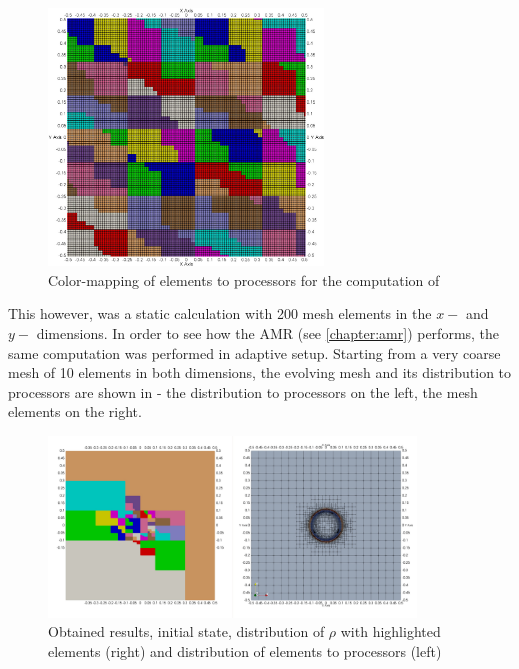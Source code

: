 \begin{figure}[H]
	\begin{center}
		\includegraphics[width=0.65\textwidth]{img/mhd-blast/old/subdomain.jpg}
	\caption{Color-mapping of elements to processors for the computation of }
	\label{figure:subdomainsBlastOld}
	\end{center}
\end{figure}
\vspace{-5mm}

This however, was a static calculation with 200 mesh elements in the $x-$ and $y-$ dimensions. In order to see how the AMR (see \cref{chapter:amr}) performs, the same computation was performed in adaptive setup. Starting from a very coarse mesh of 10 elements in both dimensions, the evolving mesh and its distribution to processors are shown in  - the distribution to processors on the left, the mesh elements on the right.

\begin{figure}[H]
	\begin{center}
		\includegraphics[width=0.87\textwidth]{img/mhd-blast/old/mya1.jpg}
	\caption{Obtained results, initial state, distribution of $\rho$ with highlighted elements (right) and distribution of elements to processors (left)}
	\label{figure:blastOldMyAdapt1}
	\end{center}
\end{figure}
\vspace{-8mm}

